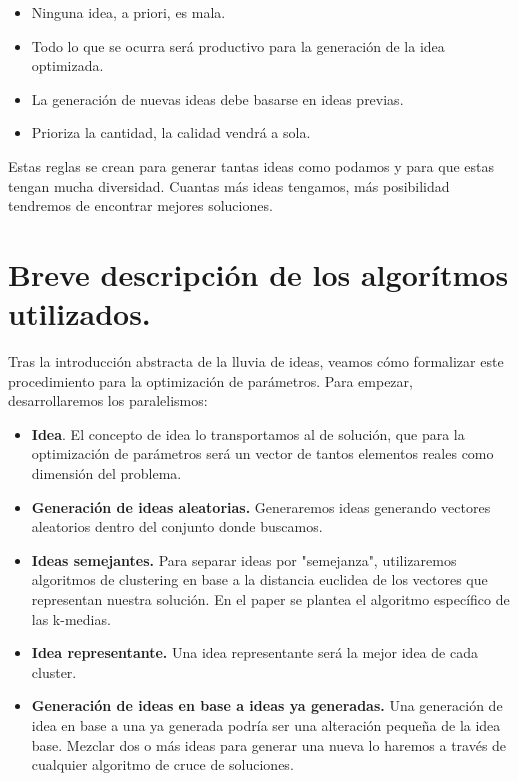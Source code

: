 \begin{itemize}
	\item Ninguna idea, a priori, es mala.
	\item Todo lo que se ocurra será productivo para la generación de la idea optimizada.
	\item La generación de nuevas ideas debe basarse en ideas previas.
	\item Prioriza la cantidad, la calidad vendrá a sola.
\end{itemize}

Estas reglas se crean para generar tantas ideas como podamos y para que estas tengan mucha diversidad. Cuantas más ideas tengamos, más posibilidad tendremos de encontrar mejores soluciones.

\newpage

\section{Breve descripción de los algorítmos utilizados.}

Tras la introducción abstracta de la lluvia de ideas, veamos cómo formalizar este procedimiento para la optimización de parámetros. Para empezar, desarrollaremos los paralelismos:\\

\begin{itemize}
	\item \textbf{Idea}. El concepto de idea lo transportamos al de solución, que para la optimización de parámetros será un vector de tantos elementos reales como dimensión del problema.

	\item \textbf{Generación de ideas aleatorias.} Generaremos ideas generando vectores aleatorios dentro del conjunto donde buscamos.

	\item \textbf{Ideas semejantes.} Para separar ideas por "semejanza", utilizaremos algoritmos de clustering en base a la distancia euclidea de los vectores que representan nuestra solución. En el paper se plantea el algoritmo específico de las k-medias.

	\item \textbf{Idea representante.} Una idea representante será la mejor idea de cada cluster.

	\item \textbf{Generación de ideas en base a ideas ya generadas.} Una generación de idea en base a una ya generada podría ser una alteración pequeña de la idea base. Mezclar dos o más ideas para generar una nueva lo haremos a través de cualquier algoritmo de cruce de soluciones.

\end{itemize}

